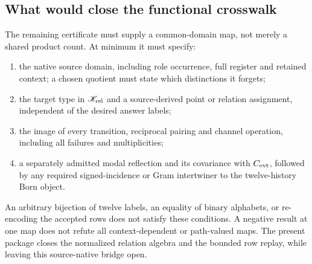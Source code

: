 \subsection{What would close the functional crosswalk}
The remaining certificate must supply a common-domain map, not merely a shared product count. At minimum it must specify:
\begin{enumerate}
\item the native source domain, including role occurrence, full register and retained context; a chosen quotient must state which distinctions it forgets;
\item the target type in $\mathscr K_{\rm rel}$ and a source-derived point or relation assignment, independent of the desired answer labels;
\item the image of every transition, reciprocal pairing and channel operation, including all failures and multiplicities;
\item a separately admitted modal reflection and its covariance with $C_{\mathrm{evt}}$, followed by any required signed-incidence or Gram intertwiner to the twelve-history Born object.
\end{enumerate}
An arbitrary bijection of twelve labels, an equality of binary alphabets, or re-encoding the accepted rows does not satisfy these conditions. A negative result at one map does not refute all context-dependent or path-valued maps. The present package closes the normalized relation algebra and the bounded row replay, while leaving this source-native bridge open.
